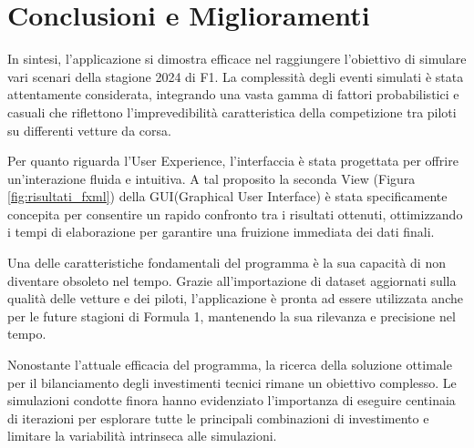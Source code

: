 

\chapter{Conclusioni e Miglioramenti}

In sintesi, l’applicazione si dimostra efficace nel raggiungere l’obiettivo di simulare vari scenari della stagione 2024 di F1. La complessità degli eventi simulati è stata attentamente considerata, integrando una vasta gamma di fattori probabilistici e casuali che riflettono l'imprevedibilità caratteristica della competizione tra piloti su differenti vetture da corsa.

Per quanto riguarda l’User Experience, l'interfaccia è stata progettata per offrire un'interazione fluida e intuitiva. A tal proposito la seconda View (Figura \ref{fig:risultati_fxml}) della GUI(Graphical User Interface) è stata specificamente concepita per consentire un rapido confronto tra i risultati ottenuti, ottimizzando i tempi di elaborazione per garantire una fruizione immediata dei dati finali.

Una delle caratteristiche fondamentali del programma è la sua capacità di non diventare obsoleto nel tempo. Grazie all'importazione di dataset aggiornati sulla qualità delle vetture e dei piloti, l'applicazione è pronta ad essere utilizzata anche per le future stagioni di Formula 1, mantenendo la sua rilevanza e precisione nel tempo.

Nonostante l'attuale efficacia del programma, la ricerca della soluzione ottimale per il bilanciamento degli investimenti tecnici rimane un obiettivo complesso. Le simulazioni condotte finora hanno evidenziato l'importanza di eseguire centinaia di iterazioni per esplorare tutte le principali combinazioni di investimento e limitare la variabilità intrinseca alle simulazioni.

